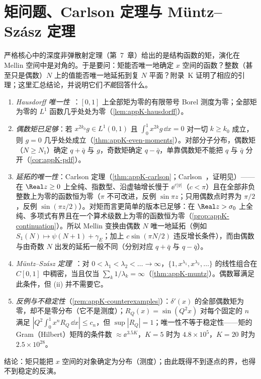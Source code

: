 \section{矩问题、Carlson 定理与 Müntz--Szász 定理}\label{sec:prelim-moments}

严格核心中的深度非弹散射定理（第~7~章）给出的是结构函数的矩，演化在 Mellin 空间中是对角的。于是要问：矩能否唯一地确定 $x$ 空间的函数？整数（甚至只是偶数）$N$ 上的值能否唯一地延拓到复 $N$ 平面？附录~K 证明了相应的引理；这里汇总结论，并说明它们\emph{不能}回答什么。

\begin{remark}[矩问题工具箱]\label{rem:prelim-moment-tools}
\begin{enumerate}[label=(\roman*),leftmargin=2.2em,itemsep=0pt,topsep=2pt]
\item \emph{Hausdorff 唯一性}~\cite{Hausdorff1923}：$[0,1]$ 上全部矩为零的有限带号 Borel 测度为零；全部矩为零的 $L^1$ 函数几乎处处为零（\cref{lem:appK-hausdorff}）。
\item \emph{偶数矩已足够}：若 $x^{2k_0}g\in L^1(0,1)$ 且 $\int_0^1x^{2k}g\,\dd x=0$ 对一切 $k\ge k_0$ 成立，则 $g=0$ 几乎处处成立（\cref{thm:appK-even-moments}）。对部分子分布，偶数矩（$N\ge N_1$）确定 $q+\bar q$ 与 $g$，奇数矩确定 $q-\bar q$，单靠偶数矩不能把 $q$ 与 $\bar q$ 分开（\cref{cor:appK-pdf}）。
\item \emph{延拓的唯一性}：Carlson 定理（\cref{thm:appK-carlson}；Carlson~\cite{Carlson1914}，证明见\cite[第~5.81~节]{Titchmarsh1939}）——在 $\Real z\ge0$ 上全纯、指数型、沿虚轴增长慢于 $\ee^{c|y|}$（$c<\pi$）且在全部非负整数上为零的函数恒为零（$\pi$ 不可改进，反例 $\sin\pi z$；只用偶数点时界为 $\pi/2$，反例 $\sin(\pi z/2)$）。对矩而言更简单的版本已足够：在 $\Real z>\sigma_0$ 上全纯、多项式有界且在一个算术级数上为零的函数恒为零（\cref{prop:appK-continuation}）。所以 Mellin 变换由偶数 $N$ 唯一地延拓（例如 $S_1(N)\mapsto\psi(N+1)+\gamma_E$；加上 $c\sin(\pi N/2)$ 违反增长条件），而由偶数与由奇数 $N$ 出发的延拓一般不同（分别对应 $q+\bar q$ 与 $q-\bar q$）。
\item \emph{Müntz--Szász 定理}~\cite{Muntz1914,Szasz1916}：对 $0<\lambda_1<\lambda_2<\dots\to\infty$，$\{1,x^{\lambda_1},x^{\lambda_2},\dots\}$ 的线性组合在 $C[0,1]$ 中稠密，当且仅当 $\sum_k1/\lambda_k=\infty$（\cref{thm:appK-muntz}）。偶数幂满足此条件，但 (ii) 并不需要它。
\item \emph{反例与不稳定性}（\cref{rem:appK-counterexamples}）：$\delta'(x)$ 的全部偶数矩为零，却不是零分布（它不是测度）；$R_Q(x)=\sin(Q^2x)$ 对每个固定的 $n$ 满足 $|Q^2\int_0^1x^nR_Q\,\dd x|\le c_n$，但 $\sup|R_Q|=1$；唯一性不等于稳定性——矩的 Gram（Hilbert）矩阵的条件数 $\approx\ee^{3.5K}$，$K=5$ 时为 $4.8\times10^5$，$K=20$ 时为 $2.5\times10^{28}$。%
\end{enumerate}
结论：矩只能把 $x$ 空间的对象确定为分布（测度）；由此既得不到逐点的界，也得不到稳定的反演。
\end{remark}

